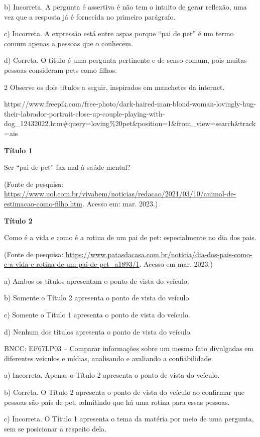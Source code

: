 b) Incorreta. A pergunta é assertiva é não tem o intuito de gerar
reflexão, uma vez que a resposta já é fornecida no primeiro parágrafo.

c) Incorreta. A expressão está entre aspas porque ``pai de pet'' é um
termo comum apenas a pessoas que o conhecem.

d) Correta. O título é uma pergunta pertinente e de senso comum, pois
muitas pessoas consideram pets como filhos.

\num{2} Observe os dois títulos a seguir, inspirados em manchetes da
internet.

https://www.freepik.com/free-photo/dark-haired-man-blond-woman-lovingly-hug-their-labrador-portrait-close-up-couple-playing-with-dog\_12432022.htm\#query=loving\%20pet\&position=1\&from\_view=search\&track=ais

\textbf{Título 1}

Ser ``pai de pet'' faz mal à saúde mental?

(Fonte de pesquisa:
\url{https://www.uol.com.br/vivabem/noticias/redacao/2021/03/10/animal-de-estimacao-como-filho.htm}.
Acesso em: mar. 2023.)

\textbf{Título 2}

Como é a vida e como é a rotina de um pai de pet: especialmente no dia
dos pais.

(Fonte de pesquisa:
\url{https://www.patasdacasa.com.br/noticia/dia-dos-pais-como-e-a-vida-e-rotina-de-um-pai-de-pet_a1893/1}.
Acesso em mar. 2023.)

a) Ambos os títulos apresentam o ponto de vista do veículo.

b) Somente o Título 2 apresenta o ponto de vista do veículo.

c) Somente o Título 1 apresenta o ponto de vista do veículo.

d) Nenhum dos títulos apresenta o ponto de vista do veículo.

BNCC: EF67LP03 -- Comparar informações sobre um mesmo fato divulgadas em
diferentes veículos e mídias, analisando e avaliando a confiabilidade.

a) Incorreta. Apenas o Título 2 apresenta o ponto de vista do veículo.

b) Correta. O Título 2 apresenta o ponto de vista do veículo ao
confirmar que pessoas são pais de pet, admitindo que há uma rotina para
essas pessoas.

c) Incorreta. O Título 1 apresenta o tema da matéria por meio de uma
pergunta, sem se posicionar a respeito dela.

